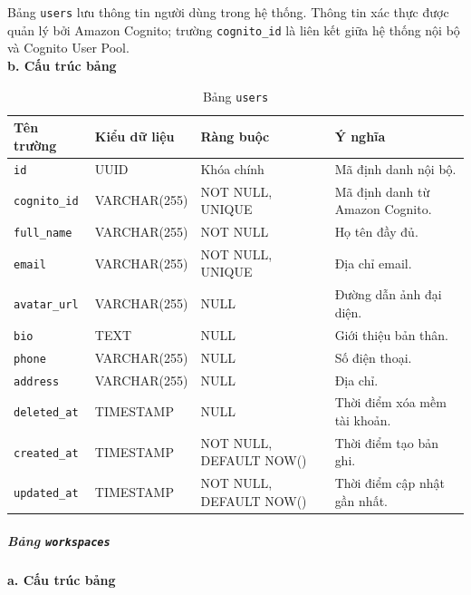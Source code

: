 Bảng \texttt{users} lưu thông tin người dùng trong hệ thống. Thông tin xác thực được quản lý bởi Amazon Cognito; trường \texttt{cognito\_id} là liên kết giữa hệ thống nội bộ và Cognito User Pool.\\

\hspace{1.5em}\textbf{b. Cấu trúc bảng}

\begin{table}[H]
\centering
\begin{tabular}{|p{3cm}|p{3.5cm}|p{3.5cm}|p{4cm}|}
\hline
\textbf{Tên trường} & \textbf{Kiểu dữ liệu} & \textbf{Ràng buộc} & \textbf{Ý nghĩa} \\
\hline
\texttt{id} & UUID & Khóa chính & Mã định danh nội bộ. \\
\hline
\texttt{cognito\_id} & VARCHAR(255) & NOT NULL, UNIQUE & Mã định danh từ Amazon Cognito. \\
\hline
\texttt{full\_name} & VARCHAR(255) & NOT NULL & Họ tên đầy đủ. \\
\hline
\texttt{email} & VARCHAR(255) & NOT NULL, UNIQUE & Địa chỉ email. \\
\hline
\texttt{avatar\_url} & VARCHAR(255) & NULL & Đường dẫn ảnh đại diện. \\
\hline
\texttt{bio} & TEXT & NULL & Giới thiệu bản thân. \\
\hline
\texttt{phone} & VARCHAR(255) & NULL & Số điện thoại. \\
\hline
\texttt{address} & VARCHAR(255) & NULL & Địa chỉ. \\
\hline
\texttt{deleted\_at} & TIMESTAMP & NULL & Thời điểm xóa mềm tài khoản. \\
\hline
\texttt{created\_at} & TIMESTAMP & NOT NULL, DEFAULT NOW() & Thời điểm tạo bản ghi. \\
\hline
\texttt{updated\_at} & TIMESTAMP & NOT NULL, DEFAULT NOW() & Thời điểm cập nhật gần nhất. \\
\hline
\end{tabular}
\caption{Bảng \texttt{users}}
\label{tab:db_users}
\end{table}


\subparagraph{Bảng \texttt{workspaces}} \mbox{}

\hspace{1.5em}\textbf{a. Cấu trúc bảng}

